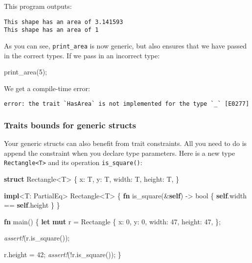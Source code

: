 \documentclass[a4paper,]{book}
\newenvironment{Shaded}{\begin{snugshade}}{\end{snugshade}}
\newcommand{\KeywordTok}[1]{\textcolor[rgb]{0.13,0.29,0.53}{\textbf{{#1}}}}
\newcommand{\DataTypeTok}[1]{\textcolor[rgb]{0.13,0.29,0.53}{{#1}}}
\newcommand{\DecValTok}[1]{\textcolor[rgb]{0.00,0.00,0.81}{{#1}}}
\newcommand{\BuiltInTok}[1]{{#1}}
\newcommand{\PreprocessorTok}[1]{\textcolor[rgb]{0.56,0.35,0.01}{\textit{{#1}}}}
\newcommand{\NormalTok}[1]{{#1}}
\begin{document}
This program outputs:

\begin{verbatim}
This shape has an area of 3.141593
This shape has an area of 1
\end{verbatim}

As you can see, \texttt{print\_area} is now generic, but also ensures
that we have passed in the correct types. If we pass in an incorrect
type:

\begin{Shaded}
\begin{Highlighting}[]
\NormalTok{print_area(}\DecValTok{5}\NormalTok{);}
\end{Highlighting}
\end{Shaded}

We get a compile-time error:

\begin{verbatim}
error: the trait `HasArea` is not implemented for the type `_` [E0277]
\end{verbatim}

\subsubsection{Traits bounds for generic
structs}\label{traits-bounds-for-generic-structs}

Your generic structs can also benefit from trait constraints. All you
need to do is append the constraint when you declare type parameters.
Here is a new type \texttt{Rectangle\textless{}T\textgreater{}} and its
operation \texttt{is\_square()}:

\begin{Shaded}
\begin{Highlighting}[]
\KeywordTok{struct} \NormalTok{Rectangle<T> \{}
    \NormalTok{x: T,}
    \NormalTok{y: T,}
    \NormalTok{width: T,}
    \NormalTok{height: T,}
\NormalTok{\}}

\KeywordTok{impl}\NormalTok{<T: }\BuiltInTok{PartialEq}\NormalTok{> Rectangle<T> \{}
    \KeywordTok{fn} \NormalTok{is_square(&}\KeywordTok{self}\NormalTok{) -> }\DataTypeTok{bool} \NormalTok{\{}
        \KeywordTok{self}\NormalTok{.width == }\KeywordTok{self}\NormalTok{.height}
    \NormalTok{\}}
\NormalTok{\}}

\KeywordTok{fn} \NormalTok{main() \{}
    \KeywordTok{let} \KeywordTok{mut} \NormalTok{r = Rectangle \{}
        \NormalTok{x: }\DecValTok{0}\NormalTok{,}
        \NormalTok{y: }\DecValTok{0}\NormalTok{,}
        \NormalTok{width: }\DecValTok{47}\NormalTok{,}
        \NormalTok{height: }\DecValTok{47}\NormalTok{,}
    \NormalTok{\};}

    \PreprocessorTok{assert!}\NormalTok{(r.is_square());}

    \NormalTok{r.height = }\DecValTok{42}\NormalTok{;}
    \PreprocessorTok{assert!}\NormalTok{(!r.is_square());}
\NormalTok{\}}
\end{Highlighting}
\end{Shaded}
\end{document}
